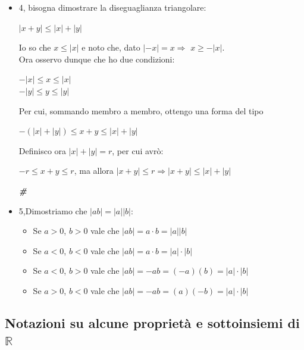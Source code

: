 \documentclass{article}
\theoremstyle{definition}
\newcommand{\cvd}{\begin{center} \textbf{\textit{\#}} \end{center}}
\begin{document}
\begin{itemize}
\begin{center}
    \LARGE $\Longleftarrow$
\end{center}
Si dimostra ora il viceversa, ossia che, se $-r \leqslant x \leqslant r$, allora $|x| \leqslant r$.
\\
Considero sempre i due casi:
\begin{itemize}
    \item Se $x \geqslant 0$, $x=|x|\leqslant r$
    \item Se $x \leqslant 0$, $|x|=-x\leqslant r$, da cui $x \geqslant -r$, per cui $-r \leqslant x \leqslant r$
\end{itemize}
\newpage
\item 4, bisogna dimostrare la diseguaglianza triangolare:
\begin{center}
$|x+y| \leqslant |x|+|y|$
\end{center}
 Io so che $x \leqslant |x|$ e noto che, dato $|-x|=x \Longrightarrow \,\, x \geqslant -|x|$.
 \\ Ora osservo dunque che ho due condizioni:
 \begin{center}
     $-|x|\leqslant x \leqslant |x|$
     \\ $-|y| \leqslant y \leqslant |y|$
 \end{center}
Per cui, sommando membro a membro, ottengo una forma del tipo
\begin{center}
    $-(|x|+|y|) \leqslant x+y \leqslant |x|+|y|$
\end{center}
Definisco ora $|x|+|y|=r$, per cui avrò:
\begin{center}
    $-r \leqslant x+y \leqslant r$, ma allora
    $|x+y|\leqslant r \Longrightarrow |x+y| \leqslant |x|+ |y|$
\cvd
\end{center}
\item 5,Dimostriamo che $|ab|=|a||b|$:
\begin{itemize}
    \item Se $a>0$, $b>0$ vale che $|ab|=a \cdot b = |a||b|$
    \item Se $a<0$, $b<0$ vale che $|ab|= a \cdot b = |a| \cdot |b|$
    \item Se $a<0$, $b>0$ vale che $|ab| = -ab= (-a)(b)=|a| \cdot |b|$
    \item Se $a>0$, $b<0$ vale che $|ab|= -ab = (a)(-b)= |a| \cdot |b|$
\end{itemize}
\end{itemize}

\subsection{Notazioni su alcune proprietà e sottoinsiemi di $\mathbb{R}$}
\end{document}
